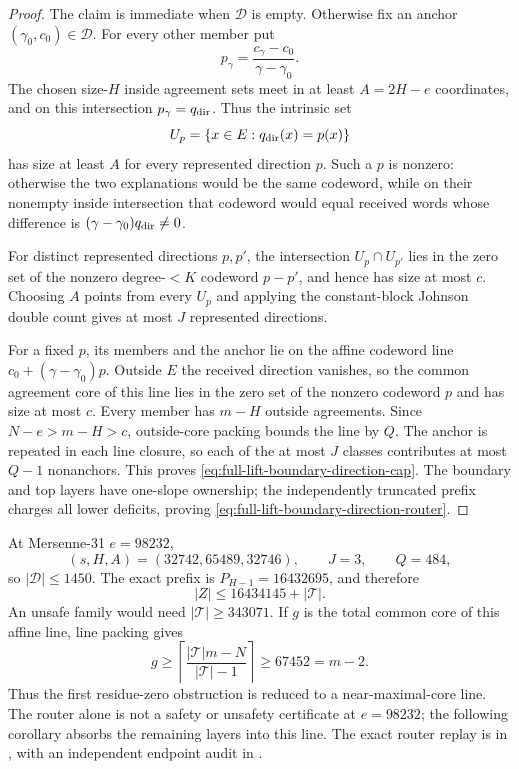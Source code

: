 \documentclass[11pt,a4paper]{amsart}
\numberwithin{equation}{section}
\theoremstyle{remark}
\begin{document}
\begin{proof}
The claim is immediate when $\mathcal D$ is empty.  Otherwise fix an anchor
$(\gamma_0,c_0)\in\mathcal D$.  For every other member put
\[
 p_\gamma=\frac{c_\gamma-c_0}{\gamma-\gamma_0}.
\]
The chosen size-$H$ inside agreement sets meet in at least $A=2H-e$
coordinates, and on this intersection $p_\gamma=q_{\rm dir}$.  Thus the
intrinsic set
\[
 U_p=\{x\in E:q_{\rm dir}(x)=p(x)\}
\]
has size at least $A$ for every represented direction $p$.  Such a $p$ is
nonzero: otherwise the two explanations would be the same codeword, while
on their nonempty inside intersection that codeword would equal received
words whose difference is $(\gamma-\gamma_0)q_{\rm dir}\ne0$.

For distinct represented directions $p,p'$, the intersection
$U_p\cap U_{p'}$ lies in the zero set of the nonzero degree-$<K$ codeword
$p-p'$, and hence has size at most $c$.  Choosing $A$ points from every
$U_p$ and applying the constant-block Johnson double count gives at most
$J$ represented directions.

For a fixed $p$, its members and the anchor lie on the affine codeword line
$c_0+(\gamma-\gamma_0)p$.  Outside $E$ the received direction vanishes, so
the common agreement core of this line lies in the zero set of the nonzero
codeword $p$ and has size at most $c$.  Every member has $m-H$ outside
agreements.  Since $N-e>m-H>c$, outside-core packing bounds the line by
$Q$.  The anchor is repeated in each line closure, so each of the at most
$J$ classes contributes at most $Q-1$ nonanchors.  This proves
\eqref{eq:full-lift-boundary-direction-cap}.  The boundary and top layers
have one-slope ownership; the independently truncated prefix charges all
lower deficits, proving \eqref{eq:full-lift-boundary-direction-router}.
\end{proof}

\begin{remark}
At Mersenne-31 $e=98232$,
\[
 (s,H,A)=(32742,65489,32746),\qquad J=3,\qquad Q=484,
\]
so $|\mathcal D|\le1450$.  The exact prefix is
$P_{H-1}=16432695$, and therefore
\[
 |Z|\le16434145+|\mathcal T|.
\]
An unsafe family would need $|\mathcal T|\ge343071$.  If $g$ is the total
common core of this affine line, line packing gives
\[
 g\ge
 \left\lceil\frac{|\mathcal T|m-N}{|\mathcal T|-1}\right\rceil
 \ge67452=m-2.
\]
Thus the first residue-zero obstruction is reduced to a near-maximal-core
line.  The router alone is not a safety or unsafety certificate at
$e=98232$; the following corollary absorbs the remaining layers into this
line.  The exact router replay is in
,
with an independent endpoint audit in
.
\end{remark}
\end{document}
